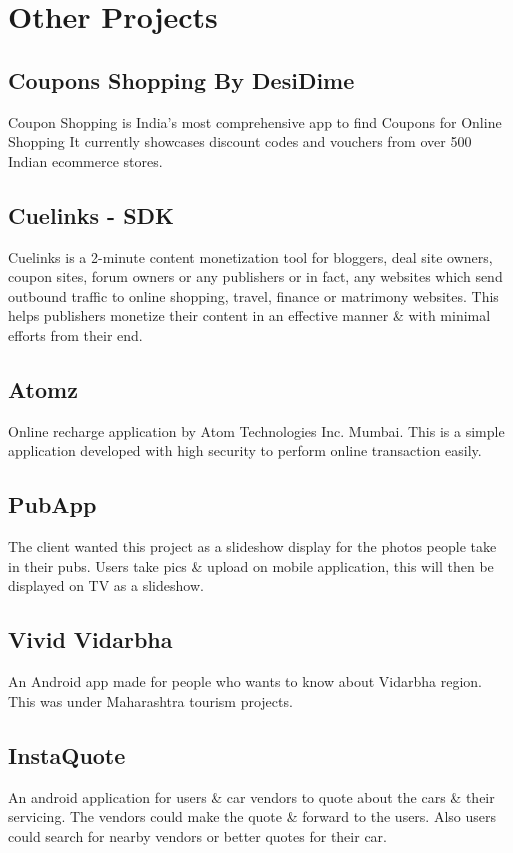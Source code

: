 \documentclass[]{deedy-resume-openfont}
\begin{document}
\begin{minipage}[t]{0.99\textwidth} 

\section{Other Projects}
\subsection{Coupons Shopping By DesiDime}
Coupon Shopping is India’s most comprehensive app to find Coupons for Online Shopping
It currently showcases discount codes and vouchers from over 500 Indian ecommerce stores.
\sectionsep

\subsection{Cuelinks - SDK}
Cuelinks is a 2-minute content monetization tool for bloggers, deal site owners, coupon sites, forum owners or any publishers or in fact, any websites which send outbound traffic to online shopping, travel, finance or matrimony websites. This helps publishers monetize their content in an effective manner \& with minimal efforts from their end.
\sectionsep

\subsection{Atomz}
Online recharge application by Atom Technologies Inc. Mumbai. This is a simple application developed with high security to perform online transaction easily.
\sectionsep

\subsection{PubApp}
The client wanted this project as a slideshow display for the photos people take in their pubs. Users take pics \& upload on mobile application, this will then be displayed on TV as  a slideshow.
\sectionsep

\subsection{Vivid Vidarbha}
An Android app made for people who wants to know about Vidarbha region. This was under Maharashtra tourism projects.
\sectionsep

\subsection{InstaQuote}
An android application for users \& car vendors to quote about the cars \& their servicing. The vendors could make the quote \& forward to the users. Also users could search for nearby vendors or better quotes for their car.
\sectionsep


\end{minipage}
\end{document}
